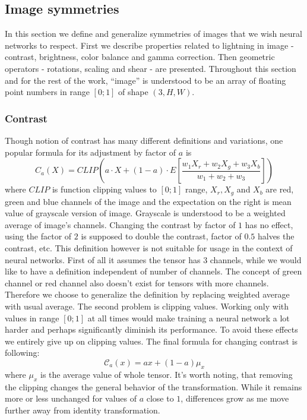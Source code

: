 \subsection{Image symmetries}
    \label{sec:transformations}
    In this section we define and generalize symmetries of images that we wish
    neural networks to respect. First we describe
    properties related to lightning in image - contrast,
    brightness, color balance and gamma correction. Then geometric operators -
    rotations, scaling and shear - are presented.
    Throughout this section and for the rest of the work,
    ``image'' is understood to be an array of
    floating point numbers in range $\left[0;1\right]$ of shape $\left(3, H,
    W\right)$.
    \subsubsection{Contrast}
    \newcommand\mcc{\mathcal{C}}
        Though notion of contrast has many different definitions and variations,
        one popular formula \cite{torch_contrast, tf_contrast}
        for its adjustment by factor of $a$ is
        \begin{equation}
            \label{eq:contrast_old}
        C_a(X) = \mathit{CLIP}\left(a\cdot X + (1-a) \cdot E\left[ \frac{w_1X_r
        + w_2X_g + w_3X_b}{w_1+w_2+w_3}\right]   \right)
        \end{equation}
        where
        $\mathit{CLIP}$ is function clipping values to $\left[0;1\right]$ range,
        $X_r, X_g$ and $X_b$ are red, green and blue channels of the image and
        the expectation on the right is mean value of grayscale version of
        image.  Grayscale is understood to be a weighted average of image's
        channels.  Changing the contrast by factor of $1$ has no effect, using
        the factor of $2$ is supposed to double the contrast, factor of $0.5$
        halves the contrast, etc.  This definition however is not suitable for
        usage in the context of neural networks.  First of all it assumes the
        tensor has 3 channels, while we would like to have a definition
        independent of number of channels. The concept of green channel or red
        channel also doesn't exist for tensors with more channels. Therefore we
        choose to generalize the definition by replacing weighted average with
        usual average. The second problem is clipping values. Working only with
        values in range $\left[0;1\right]$ at all times would make training a
        neural network a lot harder and perhaps significantly diminish its
        performance. To avoid these effects we entirely give up on clipping
        values.  The final formula for changing contrast is following:
        \begin{equation}
            \label{eq:contrast}
            \mathcal{C}_a(x) = ax + (1-a) \mu_x
        \end{equation}
        where $\mu_x$ is the average value of whole tensor. It's worth
        noting, that removing the clipping changes the general behavior of the
        transformation.  While it remains more or less unchanged for values of
        $a$ close to $1$, differences grow as me move further away from identity
        transformation.

